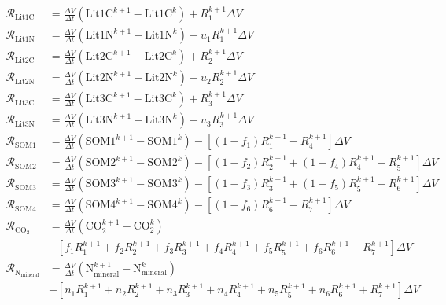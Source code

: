 \documentclass[12pt, a4paper]{article}
\begin{document}
\begin{align*}
\mathcal{R}_{\text{Lit1C}} & = \frac{\Delta V}{\Delta t} \left(\text{Lit1C}^{k+1} - \text{Lit1C}^k\right)  + R_1^{k+1} \Delta V \\
\mathcal{R}_{\text{Lit1N}} & = \frac{\Delta V}{\Delta t} \left(\text{Lit1N}^{k+1} - \text{Lit1N}^k\right)  + u_1 R_1^{k+1} \Delta V \\
\mathcal{R}_{\text{Lit2C}} & = \frac{\Delta V}{\Delta t} \left(\text{Lit2C}^{k+1} - \text{Lit2C}^k\right)  + R_2^{k+1} \Delta V \\
\mathcal{R}_{\text{Lit2N}} & = \frac{\Delta V}{\Delta t} \left(\text{Lit2N}^{k+1} - \text{Lit2N}^k\right)  + u_2 R_2^{k+1} \Delta V \\
\mathcal{R}_{\text{Lit3C}} & = \frac{\Delta V}{\Delta t} \left(\text{Lit3C}^{k+1} - \text{Lit3C}^k\right)  + R_3^{k+1} \Delta V \\
\mathcal{R}_{\text{Lit3N}} & = \frac{\Delta V}{\Delta t} \left(\text{Lit3N}^{k+1} - \text{Lit3N}^k\right)  + u_3 R_3^{k+1} \Delta V \\
\mathcal{R}_{\text{SOM1}} & = \frac{\Delta V}{\Delta t} \left(\text{SOM1}^{k+1} - \text{SOM1}^k\right)  - \left[ (1 - f_1) R_1^{k+1} - R_4^{k+1} \right] \Delta V \\
\mathcal{R}_{\text{SOM2}} & = \frac{\Delta V}{\Delta t} \left(\text{SOM2}^{k+1} - \text{SOM2}^k\right)  - \left[ (1 - f_2) R_2^{k+1} + (1 - f_4) R_4^{k+1} - R_5^{k+1} \right] \Delta V \\
\mathcal{R}_{\text{SOM3}} & = \frac{\Delta V}{\Delta t} \left(\text{SOM3}^{k+1} - \text{SOM3}^k\right)  - \left[ (1 - f_3) R_3^{k+1} + (1 - f_5) R_5^{k+1} - R_6^{k+1} \right] \Delta V \\
\mathcal{R}_{\text{SOM4}} & = \frac{\Delta V}{\Delta t} \left(\text{SOM4}^{k+1} - \text{SOM4}^k\right)  - \left[ (1 - f_6) R_6^{k+1} - R_7^{k+1} \right] \Delta V \\
\mathcal{R}_{\text{CO}_\text{2}} & = \frac{\Delta V}{\Delta t} \left(\text{CO}_\text{2}^{k+1} - \text{CO}_\text{2}^k\right)  \\
  & - \left[f_1R_1^{k+1} + f_2R_2^{k+1} + f_3R_3^{k+1} + f_4R_4^{k+1} + f_5R_5^{k+1} + f_6R_6^{k+1} + R_7^{k+1}\right]\Delta V \\
\mathcal{R}_{\text{N}_\text{mineral}} & = \frac{\Delta V}{\Delta t} \left(\text{N}_\text{mineral}^{k+1} - \text{N}_\text{mineral}^k\right) \\
  & - \left[n_1R_1^{k+1} + n_2R_2^{k+1} + n_3R_3^{k+1} + n_4R_4^{k+1} + n_5R_5^{k+1} + n_6R_6^{k+1} + R_7^{k+1}\right]\Delta V  
\end{align*}
 
\end{document}
